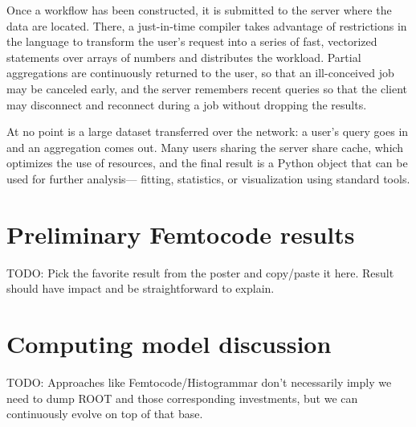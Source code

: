 \documentclass{article}
\begin{document}
Once a workflow has been constructed, it is submitted to the server where the data are located. There, a just-in-time compiler takes advantage of restrictions in the language to transform the user's request into a series of fast, vectorized statements over arrays of numbers and distributes the workload. Partial aggregations are continuously returned to the user, so that an ill-conceived job may be canceled early, and the server remembers recent queries so that the client may disconnect and reconnect during a job without dropping the results.

At no point is a large dataset transferred over the network: a user's query goes in and an aggregation comes out. Many users sharing the server share cache, which optimizes the use of resources, and the final result is a Python object that can be used for further analysis--- fitting, statistics, or visualization using standard tools.






\section{Preliminary Femtocode results}

TODO: Pick the favorite result from the poster and copy/paste it here. Result should have impact and be straightforward to explain.

\section{Computing model discussion}

TODO: Approaches like Femtocode/Histogrammar don't necessarily imply we need to dump ROOT and those corresponding investments, but we can continuously evolve on top of that base.
\end{document}
